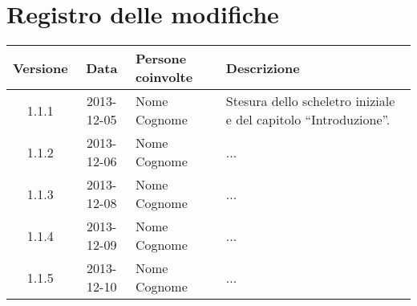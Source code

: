 \section*{Registro delle modifiche}

\small{
\begin{tabularx}{\textwidth}{|c|c|l|X|}
 \hline \textbf{Versione} & \textbf{Data} & \textbf{Persone coinvolte} & \textbf{Descrizione} \\
 
 \hline 1.1.1 & 2013-12-05 & Nome Cognome &
 Stesura dello scheletro iniziale e del capitolo ``Introduzione''.\\

 \hline 1.1.2 & 2013-12-06 & Nome Cognome &
 ...\\

 \hline 1.1.3 & 2013-12-08 & Nome Cognome &
 ...\\

 \hline 1.1.4 & 2013-12-09 & Nome Cognome &
 ...\\

 \hline 1.1.5 & 2013-12-10 & Nome Cognome &
 ...\\

 \hline
\end{tabularx}
}

